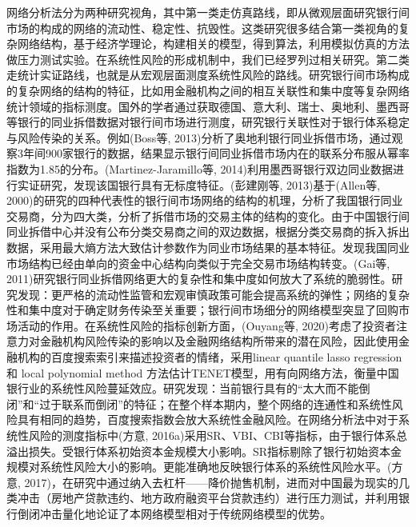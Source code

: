 网络分析法分为两种研究视角，其中第一类走仿真路线，即从微观层面研究银行间市场的构成的网络的流动性、稳定性、抗毁性。这类研究很多结合第一类视角的复杂网络结构，基于经济学理论，构建相关的模型，得到算法，利用模拟仿真的方法做压力测试实验。在系统性风险的形成机制中，我们已经罗列过相关研究。第二类走统计实证路线，也就是从宏观层面测度系统性风险的路线。研究银行间市场构成的复杂网络的结构的特征，比如用金融机构之间的相互关联性和集中度等复杂网络统计领域的指标测度。国外的学者通过获取德国、意大利、瑞士、奥地利、墨西哥等银行的同业拆借数据对银行间市场进行测度，研究银行关联性对于银行体系稳定与风险传染的关系。例如(Boss等, 2013)分析了奥地利银行同业拆借市场，通过观察3年间900家银行的数据，结果显示银行间同业拆借市场内在的联系分布服从幂率指数为1.85的分布。(Martinez-Jaramillo等, 2014)利用墨西哥银行双边同业数据进行实证研究，发现该国银行具有无标度特征。(彭建刚等, 2013)基于(Allen等, 2000)的研究的四种代表性的银行间市场网络的结构的机理，分析了我国银行同业交易商，分为四大类，分析了拆借市场的交易主体的结构的变化。由于中国银行间同业拆借中心并没有公布分类交易商之间的双边数据，根据分类交易商的拆入拆出数据，采用最大熵方法大致估计参数作为同业市场结果的基本特征。发现我国同业市场结构已经由单向的资金中心结构向类似于完全交易市场结构转变。(Gai等, 2011)研究银行同业拆借网络更大的复杂性和集中度如何放大了系统的脆弱性。研究发现：更严格的流动性监管和宏观审慎政策可能会提高系统的弹性；网络的复杂性和集中度对于确定财务传染至关重要；银行间市场细分的网络模型突显了回购市场活动的作用。在系统性风险的指标创新方面，(Ouyang等, 2020)考虑了投资者注意力对金融机构风险传染的影响以及金融网络结构所带来的潜在风险，因此使用金融机构的百度搜索索引来描述投资者的情绪，采用linear quantile lasso regression 和 local polynomial method 方法估计TENET模型，用有向网络方法，衡量中国银行业的系统性风险蔓延效应。研究发现：当前银行具有的“太大而不能倒闭”和“过于联系而倒闭”的特征；在整个样本期内，整个网络的连通性和系统性风险具有相同的趋势，百度搜索指数会放大系统性金融风险。在网络分析法中对于系统性风险的测度指标中(方意, 2016a)采用SR、VBI、CBI等指标，由于银行体系总溢出损失。受银行体系初始资本金规模大小影响。SR指标剔除了银行初始资本金规模对系统性风险大小的影响。更能准确地反映银行体系的系统性风险水平。(方意, 2017)，在研究中通过纳入去杠杆——降价抛售机制，进而对中国最为现实的几类冲击（房地产贷款违约、地方政府融资平台贷款违约）进行压力测试，并利用银行倒闭冲击量化地论证了本网络模型相对于传统网络模型的优势。

